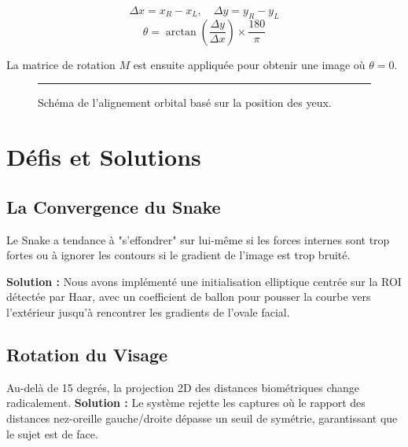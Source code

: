 \documentclass[11pt,a4paper,oneside]{report}
\begin{document}
\begin{equation}
    \Delta x = x_R - x_L, \quad \Delta y = y_R - y_L
\end{equation}
\begin{equation}
    \theta = \arctan\left(\frac{\Delta y}{\Delta x}\right) \times \frac{180}{\pi}
\end{equation}

La matrice de rotation $M$ est ensuite appliquée pour obtenir une image où $\theta = 0$.

\begin{figure}[h]
    \centering
    \rule{0.6\textwidth}{4cm}
    \caption{Schéma de l'alignement orbital basé sur la position des yeux.}
\end{figure}

\section{Défis et Solutions}

\subsection{La Convergence du Snake}
\begin{tcolorbox}[alertbox={Défi : Instabilité du Snake}]
Le Snake a tendance à "s'effondrer" sur lui-même si les forces internes sont trop fortes ou à ignorer les contours si le gradient de l'image est trop bruité.
\end{tcolorbox}

\textbf{Solution :} Nous avons implémenté une initialisation elliptique centrée sur la ROI détectée par Haar, avec un coefficient de ballon pour pousser la courbe vers l'extérieur jusqu'à rencontrer les gradients de l'ovale facial.

\subsection{Rotation du Visage}
Au-delà de 15 degrés, la projection 2D des distances biométriques change radicalement.
\textbf{Solution :} Le système rejette les captures où le rapport des distances nez-oreille gauche/droite dépasse un seuil de symétrie, garantissant que le sujet est de face.

\end{document}
